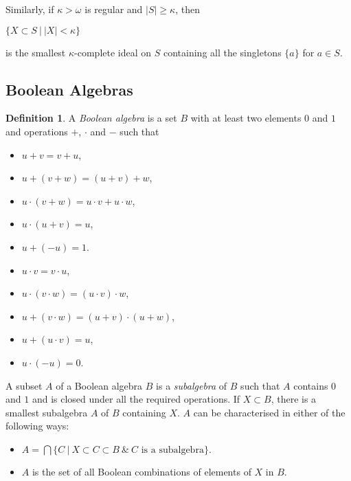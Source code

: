 \documentclass[8pt]{article}
\theoremstyle{definition}
\newtheorem{definition}{Definition}[section]
\theoremstyle{definition}
\theoremstyle{definition}
\theoremstyle{definition}
\theoremstyle{definition}
\theoremstyle{definition}
\theoremstyle{definition}
\theoremstyle{definition}
\theoremstyle{definition}
\theoremstyle{definition}
\theoremstyle{definition}
\theoremstyle{definition}
\theoremstyle{definition}
\theoremstyle{definition}
\theoremstyle{question}
\begin{document}
Similarly, if $\kappa > \omega$ is regular and $|S| \geq \kappa$, then
\begin{center}
  $\{ X \subset S \: | \: |X| < \kappa \}$
\end{center}
is the smallest $\kappa$-complete ideal on $S$ containing all the singletons $\{ a\}$ for $a \in S$.

\subsection{Boolean Algebras}

\begin{definition}
  A \emph{Boolean algebra} is a set $B$ with at least two elements $0$ and $1$ and operations $+$, $\cdot$ and $-$ such that

  \vspace{\baselineskip}

  \begin{minipage}{0.45\textwidth}
      \begin{itemize}
        \item $u + v = v + u$,
        \item $u + (v + w) = (u + v) + w$,
        \item $u \cdot (v + w) = u \cdot v + u \cdot w$,
        \item $u \cdot (u + v) = u$,
        \item $u + (- u) = 1$.
      \end{itemize}
  \end{minipage}
  \hfill
  \begin{minipage}{0.45\textwidth}
      \begin{itemize}
        \item $u \cdot v = v \cdot u$,
        \item $u \cdot (v \cdot w) = (u \cdot v) \cdot w$,
        \item $u + (v \cdot w) = (u + v) \cdot (u + w)$,
        \item $u + (u \cdot v) = u$,
        \item $u \cdot (- u) = 0$.
      \end{itemize}
  \end{minipage}
\end{definition}

A subset $A$ of a Boolean algebra $B$ is a \emph{subalgebra} of $B$ such that $A$ contains $0$ and $1$ and
is closed under all the required operations. If $X \subset B$, there is a smallest subalgebra $A$ of $B$ containing $X$.
$A$ can be characterised in either of the following ways:
\begin{itemize}
  \item $A = \bigcap \{ C \: | \: X \subset C \subset B \: \& \: \text{$C$ is a subalgebra} \}$.
  \item $A$ is the set of all Boolean combinations of elements of $X$ in $B$.
\end{itemize}
\end{document}
